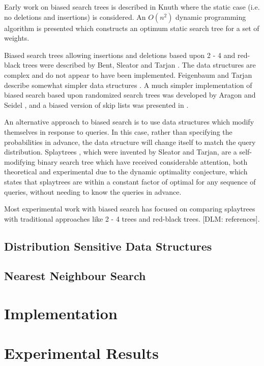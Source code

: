 \documentclass[mcs]{scsthesis}
\begin{document}
Early work on biased search trees is described in Knuth \cite{knuth} where
the static case (i.e. no deletions and insertions) is considered.  An \(O(n^2)\)
dynamic programming algorithm is presented which constructs an optimum static
search tree for a set of weights.

Biased search trees allowing insertions and deletions based upon 2 - 4 and
red-black trees were described by Bent, Sleator and Tarjan \cite{bst}.  The
data structures are complex and do not appear to have been implemented.
Feigenbaum and Tarjan describe somewhat simpler data structures \cite{bst2}. A
much simpler implementation of biased search based upon randomized search trees
was developed by Aragon and Seidel \cite{treap}, and a biased version of skip
lists \cite{skiplist} was presented in \cite{bsl2}.

An alternative approach to biased search is to use data structures which
modify themselves in response to queries.  In this case, rather than specifying
the probabilities in advance, the data structure will change itself to match
the query distribution.  Splaytrees \cite{splaytree}, which were invented by
Sleator and Tarjan, are a self-modifying binary search tree which have
received considerable attention, both theoretical and experimental due to the
dynamic optimality conjecture, which states that splaytrees are within a
constant factor of optimal for any sequence of queries, without needing to
know the queries in advance.

Most experimental work with biased search has focused on comparing splaytrees
with traditional approaches like 2 - 4 trees and red-black trees.
[DLM: references].

\section{Distribution Sensitive Data Structures}

\section{Nearest Neighbour Search}

\chapter{Implementation}

\chapter{Experimental Results}
\end{document}
